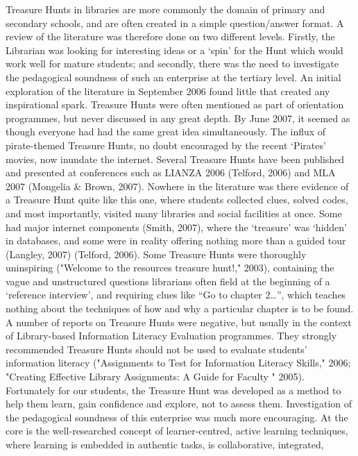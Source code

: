 Treasure Hunts in libraries are more commonly the domain of primary and secondary 
schools, and are often created in a simple question/answer format. A review of the 
literature was therefore done on two different levels. Firstly, the Librarian was looking for 
interesting ideas or a ‘spin’ for the Hunt which would work well for mature students; and 
secondly, there was the need to investigate the pedagogical soundness of such an 
enterprise at the tertiary level. 
An initial exploration of the literature in September 2006 found little that created any 
inspirational spark. Treasure Hunts were often mentioned as part of orientation 
programmes, but never discussed in any great depth. By June 2007, it seemed as though 
everyone had had the same great idea simultaneously. The influx of pirate-themed 
Treasure Hunts, no doubt encouraged by the recent ‘Pirates’ movies, now inundate the 
internet. Several Treasure Hunts have been published and presented at conferences such 
as LIANZA 2006 (Telford, 2006) and MLA 2007 (Mongelia & Brown, 2007). Nowhere in the 
literature was there evidence of a Treasure Hunt quite like this one, where students 
collected clues, solved codes, and most importantly, visited many libraries and social 
facilities at once. Some had major internet components (Smith, 2007), where the 
‘treasure’ was ‘hidden’ in databases, and some were in reality offering nothing more than a 
guided tour (Langley, 2007) (Telford, 2006). Some Treasure Hunts were thoroughly 
uninspiring ("Welcome to the resources treasure hunt!," 2003), containing the vague and 
unstructured questions librarians often field at the beginning of a ‘reference interview’, and
requiring clues like “Go to chapter 2…”, which teaches nothing about the techniques of 
how and why a particular chapter is to be found. A number of reports on Treasure Hunts 
were negative, but usually in the context of Library-based Information Literacy Evaluation 
programmes. They strongly recommended Treasure Hunts should not be used to evaluate 
students’ information literacy ("Assignments to Test for Information Literacy Skills," 2006; 
"Creating Effective Library Assignments: A Guide for Faculty " 2005). Fortunately for our 
students, the Treasure Hunt was developed as a method to help them learn, gain 
confidence and explore, not to assess them. 
Investigation of the pedagogical soundness of this enterprise was much more 
encouraging. At the core is the well-researched concept of learner-centred, active learning 
techniques, where learning is embedded in authentic tasks, is collaborative, integrated, 
